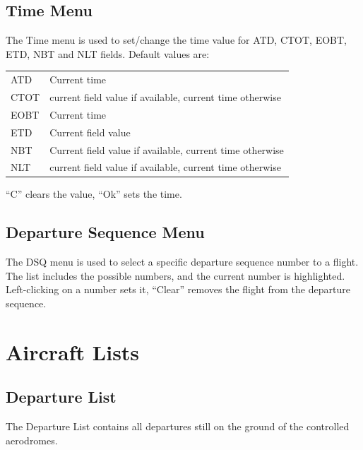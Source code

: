 \documentclass[a4paper,oneside,11pt]{memoir}
\begin{document}
\subsection{Time Menu}
\label{menu:tm}

The Time menu is used to set/change the time value for ATD, CTOT, EOBT, ETD, NBT and NLT fields.
Default values are:

\begin{longtable}{p{5cm} p{7.5cm}}
ATD     & Current time\\
CTOT    & current field value if available, current time otherwise\\
EOBT    & Current time\\
ETD     & Current field value\\
NBT     & Current field value if available, current time otherwise\\
NLT     & current field value if available, current time otherwise\\
\end{longtable}

“C” clears the value, “Ok” sets the time.

\subsection{Departure Sequence Menu}
\label{menu:dqm}

The DSQ menu is used to select a specific departure sequence number to a flight. The list includes the possible numbers, and the current number is highlighted. Left-clicking on a number sets it, “Clear” removes the flight from the departure sequence.


\section{Aircraft Lists}

\subsection{Departure List}
\label{list:dep}

The Departure List contains all departures still on the ground of the controlled aerodromes.
\end{document}
